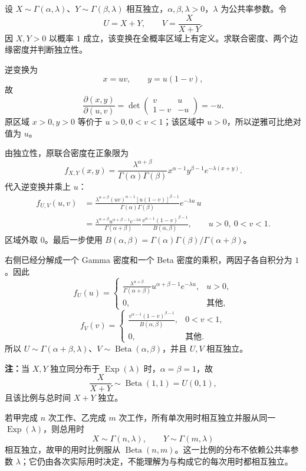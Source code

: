\begin{example}
设 $X\sim\Gamma(\alpha,\lambda)$、$Y\sim\Gamma(\beta,\lambda)$ 相互独立，$\alpha,\beta,\lambda>0$，$\lambda$ 为公共率参数。令
\[
U=X+Y,\qquad V=\frac{X}{X+Y}.
\]
因 $X,Y>0$ 以概率 $1$ 成立，该变换在全概率区域上有定义。求联合密度、两个边缘密度并判断独立性。

逆变换为
\[
x=uv,\qquad y=u(1-v),
\]
故
\[
\frac{\partial(x,y)}{\partial(u,v)}
=\det\begin{pmatrix}v&u\\1-v&-u\end{pmatrix}=-u.
\]
原区域 $x>0,y>0$ 等价于 $u>0,0<v<1$；该区域中 $u>0$，所以逆雅可比绝对值为 $u$。

由独立性，原联合密度在正象限为
\[
f_{X,Y}(x,y)=
\frac{\lambda^{\alpha+\beta}}{\Gamma(\alpha)\Gamma(\beta)}
x^{\alpha-1}y^{\beta-1}e^{-\lambda(x+y)}.
\]
代入逆变换并乘上 $u$：
\begin{align*}
f_{U,V}(u,v)
&=\frac{\lambda^{\alpha+\beta}
 (uv)^{\alpha-1}[u(1-v)]^{\beta-1}}
 {\Gamma(\alpha)\Gamma(\beta)}e^{-\lambda u}\,u\\
&=\frac{\lambda^{\alpha+\beta}
 u^{\alpha+\beta-1}e^{-\lambda u}}
 {\Gamma(\alpha+\beta)}
 \frac{v^{\alpha-1}(1-v)^{\beta-1}}{B(\alpha,\beta)},
\qquad u>0,\ 0<v<1.
\end{align*}
区域外取 $0$。最后一步使用
$B(\alpha,\beta)=\Gamma(\alpha)\Gamma(\beta)/\Gamma(\alpha+\beta)$。

右侧已经分解成一个 Gamma 密度和一个 Beta 密度的乘积，两因子各自积分为 $1$。因此
\[
f_U(u)=
\begin{cases}
\displaystyle\frac{\lambda^{\alpha+\beta}}{\Gamma(\alpha+\beta)}
u^{\alpha+\beta-1}e^{-\lambda u},&u>0,\\
0,&\text{其他},
\end{cases}
\]
\[
f_V(v)=
\begin{cases}
\displaystyle\frac{v^{\alpha-1}(1-v)^{\beta-1}}{B(\alpha,\beta)},&0<v<1,\\
0,&\text{其他}.
\end{cases}
\]
所以 $U\sim\Gamma(\alpha+\beta,\lambda)$、$V\sim\operatorname{Beta}(\alpha,\beta)$，并且 $U,V$ 相互独立。
\end{example}

\textbf{注：}\quad 当 $X,Y$ 独立同分布于 $\operatorname{Exp}(\lambda)$ 时，$\alpha=\beta=1$，故
\[
\frac{X}{X+Y}\sim\operatorname{Beta}(1,1)=U(0,1),
\]
且该比例与总时间 $X+Y$ 独立。

若甲完成 $n$ 次工作、乙完成 $m$ 次工作，所有单次用时相互独立并服从同一 $\operatorname{Exp}(\lambda)$，则总用时
\[
X\sim\Gamma(n,\lambda),\qquad Y\sim\Gamma(m,\lambda)
\]
相互独立，故甲的用时比例服从 $\operatorname{Beta}(n,m)$。这一比例的分布不依赖公共率参数 $\lambda$；它仍由各次实际用时决定，不能理解为与构成它的每次用时都相互独立。

